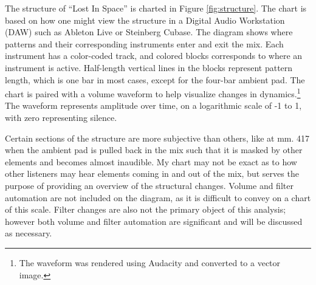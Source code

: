 \documentclass[12pt,twoside]{reedthesis}
\begin{document}
The structure of ``Lost In Space'' is charted in Figure \ref{fig:structure}. The chart is based on how one might view the structure in a Digital Audio Workstation (DAW) such as Ableton Live or Steinberg Cubase. The diagram shows where patterns and their corresponding instruments enter and exit the mix. Each instrument has a color-coded track, and colored blocks corresponds to where an instrument is active. Half-length vertical lines in the blocks represent pattern length, which is one bar in most cases, except for the four-bar ambient pad. The chart is paired with a volume waveform to help visualize changes in dynamics.\footnote{The waveform was rendered using Audacity and converted to a vector image.} The waveform represents amplitude over time, on a logarithmic scale of -1 to 1, with zero representing silence.

Certain sections of the structure are more subjective than others, like at mm. 417 when the ambient pad is pulled back in the mix such that it is masked by other elements and becomes almost inaudible. My chart may not be exact as to how other listeners may hear elements coming in and out of the mix, but serves the purpose of providing an overview of the structural changes. Volume and filter automation are not included on the diagram, as it is difficult to convey on a chart of this scale. Filter changes are also not the primary object of this analysis; however both volume and filter automation are significant and will be discussed as necessary.
\end{document}
